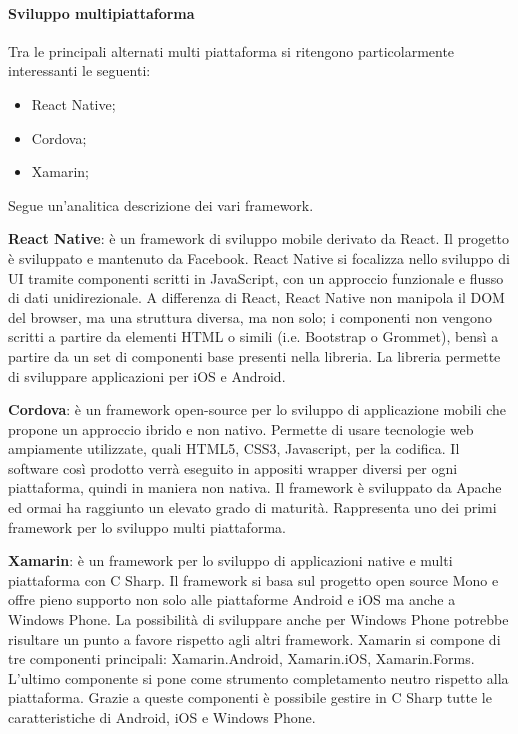 \paragraph{Sviluppo multipiattaforma}
Tra le principali alternati multi piattaforma si ritengono particolarmente interessanti le seguenti:
\begin{itemize}
    \item React Native;
    \item Cordova;
    \item Xamarin;
\end{itemize}
Segue un’analitica descrizione dei vari framework.

\textbf{React Native}: è un framework di sviluppo mobile derivato da React. Il progetto è sviluppato e mantenuto da Facebook. React Native si focalizza nello sviluppo di UI tramite componenti scritti in JavaScript, con un approccio funzionale e flusso di dati unidirezionale.  A differenza di React, React Native non manipola il DOM del browser, ma una struttura diversa, ma non solo; i componenti non vengono scritti a partire da elementi HTML o simili (i.e. Bootstrap o Grommet),  bensì a partire da un set di componenti base presenti nella libreria. La libreria permette di sviluppare applicazioni per iOS e Android.

\textbf{Cordova}: è un framework open-source per lo sviluppo di applicazione mobili che propone un approccio ibrido e non nativo. Permette di usare tecnologie web ampiamente utilizzate, quali HTML5, CSS3, Javascript, per la codifica. Il software così prodotto verrà eseguito in appositi wrapper diversi per ogni piattaforma, quindi in maniera non nativa. Il framework è sviluppato da Apache ed ormai ha raggiunto un elevato grado di maturità. Rappresenta uno dei primi framework per lo sviluppo multi piattaforma.

\textbf{Xamarin}: è un framework per lo sviluppo di applicazioni native e multi piattaforma con C Sharp. Il framework si basa sul progetto open source Mono e offre pieno supporto non solo alle piattaforme Android e iOS ma anche a Windows Phone. La possibilità di sviluppare anche per Windows Phone potrebbe risultare un punto a favore rispetto agli altri framework. Xamarin si compone di tre componenti principali: Xamarin.Android, Xamarin.iOS, Xamarin.Forms. L’ultimo componente si pone come strumento completamento neutro rispetto alla piattaforma. Grazie a queste componenti è possibile gestire in C Sharp tutte le caratteristiche di Android, iOS e Windows Phone.
\medskip

